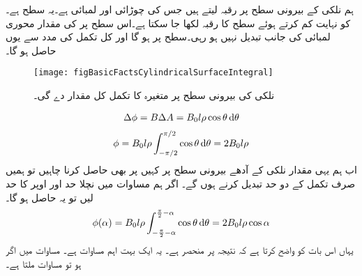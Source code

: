 	ہم نلکی کے بیرونی سطح پر رقبہ   لیتے ہیں جس کی چوڑائی   اور لمبائی  ہے۔یہ سطح  ہے۔ کو نہایت کم کرتے ہوئے سطح کا رقبہ  لکھا جا سکتا ہے۔اس سطح پر  کی مقدار محوری لمبائی  کی جانب تبدیل نہیں ہو رہی۔سطح   پر  ہو گا اور کل  تکمل کی مدد سے یوں حاصل ہو گا۔
\begin{figure}
\centering
\texttt{[image: figBasicFactsCylindricalSurfaceIntegral]}
\caption{نلکی کی بیرونی سطح پر متغیرہ کا تکمل کل مقدار دے گی۔}
\label{شکل_حقائق_نلکی_سطحی_تکمل}
\end{figure}
%
\begin{align}
\Delta \phi=B \Delta A=B_0 l \rho \cos \theta \dif \theta
\end{align}
%
\begin{align}\label{مساوات_بنیادی_بہاو_بذریع_تکمل_زاویہ_صفر}
\phi = B_0 l \rho \int_{-\pi/2}^{\pi/2} \cos \theta \dif \theta =2 B_0 l \rho
\end{align}
اب ہم یہی مقدار نلکی کے آدھے بیرونی سطح پر کہیں پر بھی حاصل کرنا چاہیں تو ہمیں صرف تکمل کے دو حد تبدیل کرنے ہوں گے۔  اگر ہم مساوات   میں نچلا حد  اور اوپر کا حد  لیں تو یہ حاصل ہو گا۔
\begin{align}\label{مساوات_بنیادی_بہاو_بذریع_تکمل_کوئی_زاویہ}
\phi (\alpha) = B_0 l \rho \int_{-\frac{\pi}{2}-\alpha}^{\frac{\pi}{2}-\alpha} \cos \theta \dif \theta =2 B_0 l \rho \cos \alpha
\end{align}
یہاں   اس بات کو واضح کرتا ہے کہ نتیجہ  پر منحصر ہے۔ یہ ایک بہت اہم مساوات ہے۔ مساوات  میں  اگر  ہو تو مساوات    ملتا ہے۔

